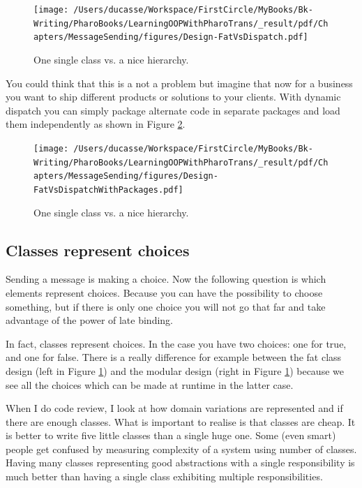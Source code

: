 \documentclass[10pt,twoside,english]{_support/latex/sbabook/sbabook}
\begin{document}
\begin{figure}

\begin{center}
\texttt{[image: /Users/ducasse/Workspace/FirstCircle/MyBooks/Bk-Writing/PharoBooks/LearningOOPWithPharoTrans/\_result/pdf/Chapters/MessageSending/figures/Design-FatVsDispatch.pdf]}\caption{One single class vs. a nice hierarchy.\label{figFat}}\end{center}
\end{figure}


You could think that this is a not a problem but imagine that now for a business you want to ship different products or solutions to your clients. With dynamic dispatch you can simply package alternate code in separate packages and load them independently as shown in Figure \ref{inhNoFatPackage}.


\begin{figure}

\begin{center}
\texttt{[image: /Users/ducasse/Workspace/FirstCircle/MyBooks/Bk-Writing/PharoBooks/LearningOOPWithPharoTrans/\_result/pdf/Chapters/MessageSending/figures/Design-FatVsDispatchWithPackages.pdf]}\caption{One single class vs. a nice hierarchy.\label{inhNoFatPackage}}\end{center}
\end{figure}

\subsection{Classes represent choices}
Sending a message is making a choice. Now the following question is which elements represent choices. Because you can have the possibility to choose something, but if there is only one choice you will not go that far and take advantage of the power of late binding.

In fact, classes represent choices. In the  case you have two choices: one for true, and one for false.
There is a really difference for example between the fat class design (left in Figure \ref{figFat}) and the modular design (right in Figure \ref{figFat}) because we see all the choices which can be made at runtime in the latter case.

When I do code review, I look at how domain variations are represented and if there are enough classes.
What is important to realise is that classes are cheap. It is better to write five little classes than a single huge one.
Some (even smart) people get confused by measuring complexity of a system using number of classes. Having many classes 
representing good abstractions with a single responsibility is much better than having a single class exhibiting multiple responsibilities.
\end{document}
